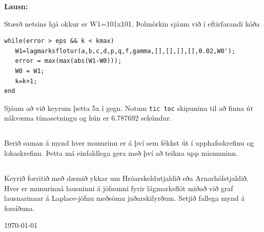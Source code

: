 \documentclass[11pt,a4paper,titlepage]{article}
\begin{document}
 \par
 \textbf{Lausn:}\par
Stærð netsins hjá okkur er W1=101x101.  Þolmörkin sjáum við í eftirfarandi kóða
\begin{verbatim}
while(error > eps && k < kmax)
   W1=lagmarksflotur(a,b,c,d,p,q,f,gamma,[],[],[],[],0.02,W0');
   error = max(max(abs(W1-W0)));
   W0 = W1;
   k=k+1;
end
\end{verbatim} 
Sjáum að við keyrum þetta 5x í gegn. Notum \verb|tic toc| skipunina til að finna út nákvæma tímasetningu og hún er 6.787692 sekúndur.

\subsection{}
Berið saman á mynd hver munurinn er á því sem fékkst út í upphafsskrefinu og lokaskrefinu. Þetta má einfaldlega gera með því að teikna upp mismuninn.

\subsection{}
Keyrið forritið með dæmið ykkar um Hróarskeldutjaldið eða Arnarhólstjaldið. Hver er munurinná lausninni á jöfnunni fyrir lágmarksflöt miðað við graf lausnarinnar á Laplace-jöfnu meðsömu jaðarskilyrðum. Setjið fallega mynd á forsíðuna.
 
 
\newpage
\begin{flushright}
 \today
\end{flushright}
\end{document}
